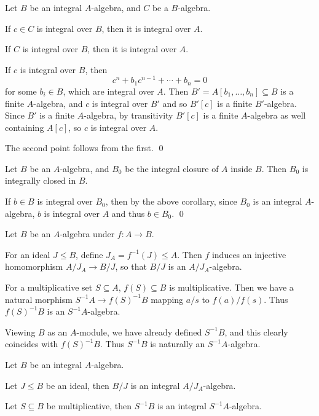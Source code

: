 \eproof

\bcoro

    Let $B$ be an integral $A$-algebra, and $C$ be a $B$-algebra.
    \benum
        \item If $c\in C$ is integral over $B$, then it is integral over $A$.
        \item If $C$ is integral over $B$, then it is integral over $A$.
    \eenum

\ecoro

\bproof

    If $c$ is integral over $B$, then
    $$ c^n + b_1c^{n-1} + \cdots + b_n = 0 $$
    for some $b_i\in B$, which are integral over $A$.
    Then $B'=A[b_1,\dots,b_n]\subseteq B$ is a finite $A$-algebra, and $c$ is integral over $B'$ and so $B'[c]$ is a finite $B'$-algebra.
    Since $B'$ is a finite $A$-algebra, by transitivity $B'[c]$ is a finite $A$-algebra as well containing $A[c]$, so $c$ is integral over $A$.

    The second point follows from the first.
    \qed

\eproof

\bcoro

    Let $B$ be an $A$-algebra, and $B_0$ be the integral closure of $A$ inside $B$.
    Then $B_0$ is integrally closed in $B$.

\ecoro

\bproof

    If $b\in B$ is integral over $B_0$, then by the above corollary, since $B_0$ is an integral $A$-algebra, $b$ is integral over $A$ and thus $b\in B_0$.
    \qed

\eproof

Let $B$ be an $A$-algebra under $f\colon A\to B$.
\benum
    \item For an ideal $J\leq B$, define $J_A=f^{-1}(J)\leq A$.
    Then $f$ induces an injective homomorphism $A/J_A\to B/J$, so that $B/J$ is an $A/J_A$-algebra.
    \item For a multiplicative set $S\subseteq A$, $f(S)\subseteq B$ is multiplicative.
    Then we have a natural morphism $S^{-1}A\to f(S)^{-1}B$ mapping $a/s$ to $f(a)/f(s)$.
    Thus $f(S)^{-1}B$ is an $S^{-1}A$-algebra.
    \item Viewing $B$ as an $A$-module, we have already defined $S^{-1}B$, and this clearly coincides with $f(S)^{-1}B$.
    Thus $S^{-1}B$ is naturally an $S^{-1}A$-algebra.
\eenum

\bprop

    Let $B$ be an integral $A$-algebra.
    \benum
        \item Let $J\leq B$ be an ideal, then $B/J$ is an integral $A/J_A$-algebra.
        \item Let $S\subseteq B$ be multiplicative, then $S^{-1}B$ is an integral $S^{-1}A$-algebra.
    \eenum

